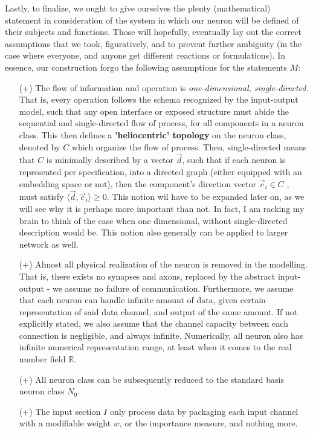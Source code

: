 Lastly, to finalize, we ought to give ourselves the plenty (mathematical) statement in consideration of the system in which our neuron will be defined of their subjects and functions. Those will hopefully, eventually lay out the correct assumptions that we took, figuratively, and to prevent further ambiguity (in the case where everyone, and anyone get different reactions or formulations). In essence, our construction forgo the following assumptions for the statements $M$:

\begin{itemize}[itemsep=1pt, topsep=3pt,leftmargin=4pt]
    \item[(+)] The flow of information and operation is \textit{one-dimensional, single-directed}. That is, every operation follows the schema recognized by the input-output model, such that any open interface or exposed structure must abide the sequential and single-directed flow of process, for all components in a neuron class. This then defines a \textbf{'heliocentric' topology}  on the neuron class, denoted by $C$ which organize the flow of process. Then, single-directed means that $C$ is minimally described by a vector $\vec{d}$, such that if each neuron is represented per specification, into a directed graph (either equipped with an embedding space or not), then the component's direction vector $\vec{c}_{i}\in C$ , must satisfy $\langle \vec{d},\vec{c}_{i}\rangle \geq 0$. This notion wil have to be expanded later on, as we will see why it is perhaps more important than not. In fact, I am racking my brain to think of the case when one dimensional, without single-directed description would be. This notion also generally can be applied to larger network as well. 
    \item[(+)] Almost all physical realization of the neuron is removed in the modelling. That is, there exists no synapses and axons, replaced by the abstract input-output - we assume no failure of communication. Furthermore, we assume that each neuron can handle infinite amount of data, given certain representation of said data channel, and output of the same amount. If not explicitly stated, we also assume that the channel capacity between each connection is negligible, and always infinite. Numerically, all neuron also has infinite numerical representation range, at least when it comes to the real number field $\mathbb{R}$. 
    \item[(+)] All neuron class can be subsequently reduced to the standard basis neuron class $N_{0}$. 
    \item[(+)] The input section $I$ only process data by packaging each input channel with a modifiable weight $w$, or the importance measure, and nothing more. 

\end{itemize}
